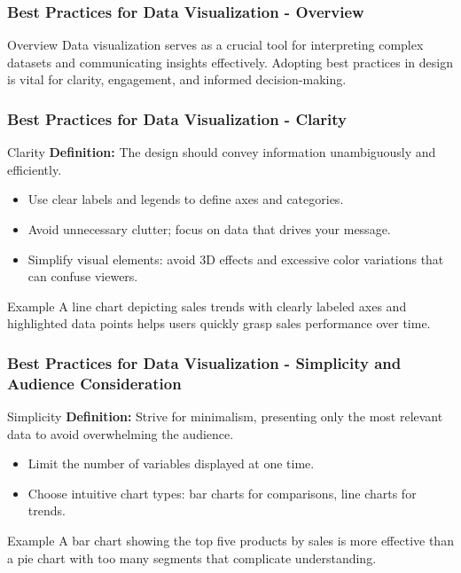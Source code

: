\documentclass[aspectratio=169]{beamer}
\begin{document}
\begin{frame}[fragile]
    \frametitle{Best Practices for Data Visualization - Overview}
    \begin{block}{Overview}
        Data visualization serves as a crucial tool for interpreting complex datasets and communicating insights effectively. 
        Adopting best practices in design is vital for clarity, engagement, and informed decision-making.
    \end{block}
\end{frame}

\begin{frame}[fragile]
    \frametitle{Best Practices for Data Visualization - Clarity}
    \begin{block}{Clarity}
        \textbf{Definition:} The design should convey information unambiguously and efficiently.
    \end{block}
    \begin{itemize}
        \item Use clear labels and legends to define axes and categories.
        \item Avoid unnecessary clutter; focus on data that drives your message.
        \item Simplify visual elements: avoid 3D effects and excessive color variations that can confuse viewers.
    \end{itemize}
    \begin{block}{Example}
        A line chart depicting sales trends with clearly labeled axes and highlighted data points helps users quickly grasp sales performance over time.
    \end{block}
\end{frame}

\begin{frame}[fragile]
    \frametitle{Best Practices for Data Visualization - Simplicity and Audience Consideration}
    \begin{block}{Simplicity}
        \textbf{Definition:} Strive for minimalism, presenting only the most relevant data to avoid overwhelming the audience.
    \end{block}
    \begin{itemize}
        \item Limit the number of variables displayed at one time.
        \item Choose intuitive chart types: bar charts for comparisons, line charts for trends.
    \end{itemize}
    \begin{block}{Example}
        A bar chart showing the top five products by sales is more effective than a pie chart with too many segments that complicate understanding.
    \end{block}
\end{frame}
\end{document}
